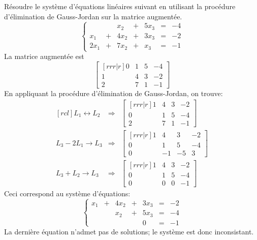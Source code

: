 \begin{exemple}
	Résoudre le système d'équations linéaires suivant en utilisant la procédure d'élimination de Gauss-Jordan
	sur la matrice augmentée.
	\[
	\left\{ \begin{matrix}
		 && x_2 &+& 5x_3 &=& -4\\
		x_1 &+& 4x_2 &+& 3x_3 &=& -2\\
		2x_1 &+& 7x_2 &+& x_3 &=& -1
		\end{matrix}\right.
	\]
	\solution
	La matrice augmentée est
	\[
	\begin{bmatrix}[rrr|r]
		0 &1& 5 & -4\\
		1 &4& 3& -2\\
		2 & 7 & 1 & -1
	\end{bmatrix}
	\]
	En appliquant la procédure d'élimination de Gauss-Jordan, on trouve:
        \[
        \begin{matrix}[rcl]
        L_1 \leftrightarrow L_2
        &\Longrightarrow&
	\begin{bmatrix}[rrr|r]
		1 &4& 3& -2\\
		0 &1& 5 & -4\\
		2 & 7 & 1 & -1
	\end{bmatrix}
	\\[20pt]
	L_3 - 2L_1 \rightarrow L_3
        &\Longrightarrow&
	\begin{bmatrix}[rrr|r]
		1 &4& 3& -2\\
		0 &1& 5 & -4\\
		0 & -1 & -5 & 3
	\end{bmatrix}
	\\[20pt]
        L_3 + L_2 \rightarrow L_3
        &\Longrightarrow&
	\begin{bmatrix}[rrr|r]
		1 &4& 3& -2\\
		0 &1& 5 & -4\\
		0 & 0 & 0 & -1
	\end{bmatrix}
        \end{matrix}
        \]
        Ceci correspond au système d'équations:
        \[
        \left\{
        \begin{matrix}
        x_1 &+& 4x_2 &+& 3x_3 &=& -2 \\
        &&          x_2 &+& 5x_3 &=& -4 \\
        && && 0 &=& -1
        \end{matrix}
        \right.
        \]
        La dernière équation n'admet pas de solutions; le système est donc inconsistant.
\end{exemple}


